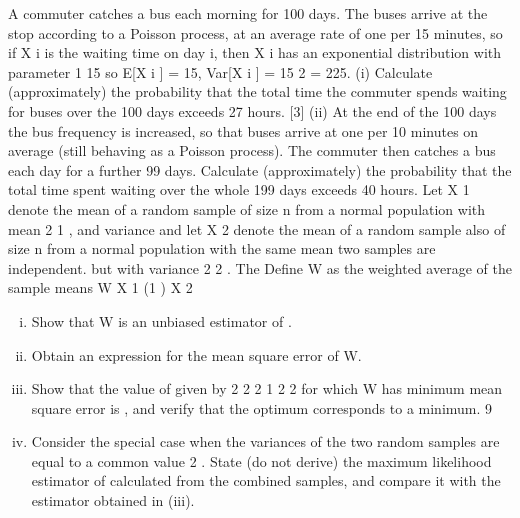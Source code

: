 \documentclass[a4paper,12pt]{article}
\begin{document}
\begin{enumerate}
A commuter catches a bus each morning for 100 days. The buses arrive at the stop
according to a Poisson process, at an average rate of one per 15 minutes, so if X i is the
waiting time on day i, then X i has an exponential distribution with parameter
1
15
so
E[X i ] = 15, Var[X i ] = 15 2 = 225.
(i) Calculate (approximately) the probability that the total time the commuter
spends waiting for buses over the 100 days exceeds 27 hours.
[3]
(ii) At the end of the 100 days the bus frequency is increased, so that buses arrive at one per 10 minutes on average (still behaving as a Poisson process). The commuter then catches a bus each day for a further 99 days. Calculate (approximately) the probability that the total time spent waiting over the whole 199 days exceeds 40 hours.
Let X 1 denote the mean of a random sample of size n from a normal population with
mean
2
1 ,
and variance
and let X 2 denote the mean of a random sample also of size n from a normal population with the same mean
two samples are independent.
but with variance
2
2 .
The
Define W as the weighted average of the sample means
W
X 1 (1
) X 2

\begin{enumerate}[(i)]
\item Show that W is an unbiased estimator of . 
\item Obtain an expression for the mean square error of W.
\item  Show that the value of
given by
2
2
2
1
2
2
for which W has minimum mean square error is
,
and verify that the optimum corresponds to a minimum.
9
\item  Consider the special case when the variances of the two random samples are equal to a common value 2 . State (do not derive) the maximum likelihood estimator of calculated from the combined samples, and compare it with the estimator obtained in (iii).
\end{enumerate}



\end{enumerate}
\end{document}
